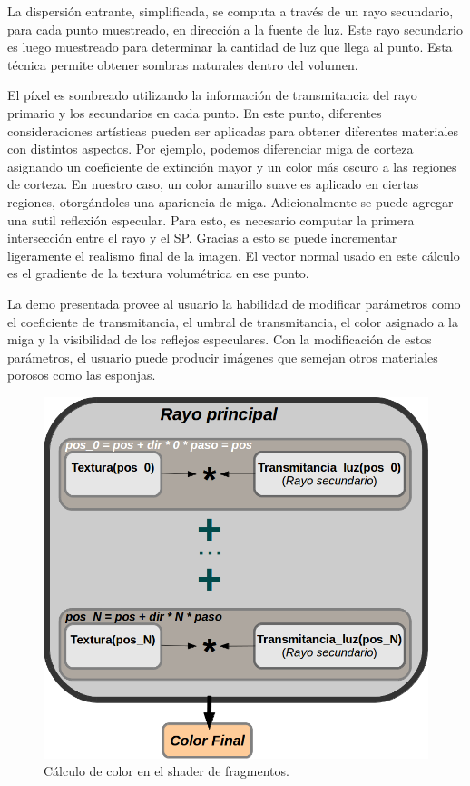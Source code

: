 La dispersión entrante, simplificada, se computa a través de un rayo secundario, para cada punto muestreado, en dirección a la fuente de luz.
Este rayo secundario es luego muestreado para determinar la cantidad de luz que llega al punto.
Esta técnica permite obtener sombras naturales dentro del volumen.

El píxel es sombreado utilizando la información de transmitancia del rayo primario y los secundarios en cada punto.
En este punto, diferentes consideraciones artísticas pueden ser aplicadas para obtener diferentes materiales con distintos aspectos.
Por ejemplo, podemos diferenciar miga de corteza asignando un coeficiente de extinción mayor y un color más oscuro a las regiones de corteza.
En nuestro caso, un color amarillo suave es aplicado en ciertas regiones, otorgándoles una apariencia de miga.
Adicionalmente se puede agregar una sutil reflexión especular.
Para esto, es necesario computar la primera intersección entre el rayo y el SP.
Gracias a esto se puede incrementar ligeramente el realismo final de la imagen.
El vector normal usado en este cálculo es el gradiente de la textura volumétrica en ese punto.

La demo presentada provee al usuario la habilidad de modificar parámetros como el coeficiente de transmitancia, el umbral de transmitancia, el color asignado a la miga y la visibilidad de los reflejos especulares.
Con la modificación de estos parámetros, el usuario puede producir imágenes que semejan otros materiales porosos como las esponjas.

\begin{figure}[htb!]
  \centerline{\includegraphics[width=13cm]{fragmentshader}}
  \caption{Cálculo de color en el shader de fragmentos. }
  \label{fg:fragmentshader}
\end{figure}


